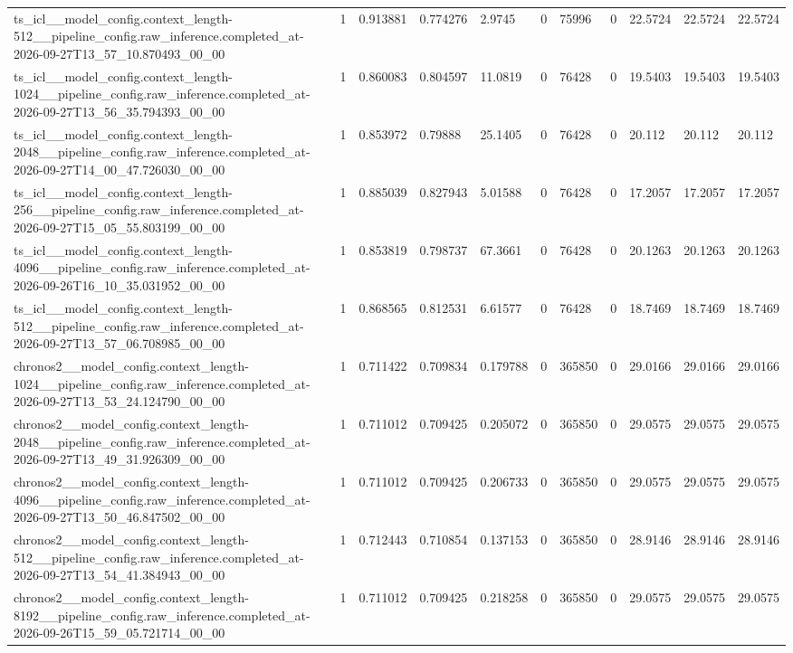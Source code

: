 \begin{tabular}{lllllllllll}
ts\_icl\_\_model\_config.context\_length-512\_\_pipeline\_config.raw\_inference.completed\_at-2026-09-27T13\_57\_10.870493\_00\_00 & 1 & 0.913881 & 0.774276 & 2.9745 & 0 & 75996 & 0 & 22.5724 & 22.5724 & 22.5724 \\
ts\_icl\_\_model\_config.context\_length-1024\_\_pipeline\_config.raw\_inference.completed\_at-2026-09-27T13\_56\_35.794393\_00\_00 & 1 & 0.860083 & 0.804597 & 11.0819 & 0 & 76428 & 0 & 19.5403 & 19.5403 & 19.5403 \\
ts\_icl\_\_model\_config.context\_length-2048\_\_pipeline\_config.raw\_inference.completed\_at-2026-09-27T14\_00\_47.726030\_00\_00 & 1 & 0.853972 & 0.79888 & 25.1405 & 0 & 76428 & 0 & 20.112 & 20.112 & 20.112 \\
ts\_icl\_\_model\_config.context\_length-256\_\_pipeline\_config.raw\_inference.completed\_at-2026-09-27T15\_05\_55.803199\_00\_00 & 1 & 0.885039 & 0.827943 & 5.01588 & 0 & 76428 & 0 & 17.2057 & 17.2057 & 17.2057 \\
ts\_icl\_\_model\_config.context\_length-4096\_\_pipeline\_config.raw\_inference.completed\_at-2026-09-26T16\_10\_35.031952\_00\_00 & 1 & 0.853819 & 0.798737 & 67.3661 & 0 & 76428 & 0 & 20.1263 & 20.1263 & 20.1263 \\
ts\_icl\_\_model\_config.context\_length-512\_\_pipeline\_config.raw\_inference.completed\_at-2026-09-27T13\_57\_06.708985\_00\_00 & 1 & 0.868565 & 0.812531 & 6.61577 & 0 & 76428 & 0 & 18.7469 & 18.7469 & 18.7469 \\
chronos2\_\_model\_config.context\_length-1024\_\_pipeline\_config.raw\_inference.completed\_at-2026-09-27T13\_53\_24.124790\_00\_00 & 1 & 0.711422 & 0.709834 & 0.179788 & 0 & 365850 & 0 & 29.0166 & 29.0166 & 29.0166 \\
chronos2\_\_model\_config.context\_length-2048\_\_pipeline\_config.raw\_inference.completed\_at-2026-09-27T13\_49\_31.926309\_00\_00 & 1 & 0.711012 & 0.709425 & 0.205072 & 0 & 365850 & 0 & 29.0575 & 29.0575 & 29.0575 \\
chronos2\_\_model\_config.context\_length-4096\_\_pipeline\_config.raw\_inference.completed\_at-2026-09-27T13\_50\_46.847502\_00\_00 & 1 & 0.711012 & 0.709425 & 0.206733 & 0 & 365850 & 0 & 29.0575 & 29.0575 & 29.0575 \\
chronos2\_\_model\_config.context\_length-512\_\_pipeline\_config.raw\_inference.completed\_at-2026-09-27T13\_54\_41.384943\_00\_00 & 1 & 0.712443 & 0.710854 & 0.137153 & 0 & 365850 & 0 & 28.9146 & 28.9146 & 28.9146 \\
chronos2\_\_model\_config.context\_length-8192\_\_pipeline\_config.raw\_inference.completed\_at-2026-09-26T15\_59\_05.721714\_00\_00 & 1 & 0.711012 & 0.709425 & 0.218258 & 0 & 365850 & 0 & 29.0575 & 29.0575 & 29.0575 \\

\end{tabular}
